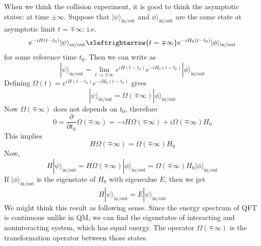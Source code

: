 When we think the collision experiment, it is good to think the asymptotic states: at time $\pm \infty$. Suppose that $|\psi\rangle_{\mathrm{in/out}}$ and $\phi\rangle_{\mathrm{in/out}}$ are the same state at asymptotic limit $t=\mp\infty$: i.e.
\begin{equation}
e^{-iH(t-t_0)}|\psi\rangle_{\mathrm{in/out}}\xleftrightarrow{t=\mp \infty} e^{-iH_0(t-t_0)}|\phi\rangle_{\mathrm{in/out}}
\end{equation}
for some reference time $t_0$. Then we can write as
\begin{equation}
|\psi\rangle_{\mathrm{in/out}}=\lim_{t\rightarrow \mp\infty}e^{iH(t-t_0)}e^{-iH_0 (t-t_0)}|\phi\rangle_{\mathrm{in/out}}
\end{equation}
Defining $\Omega(t)=e^{iH(t-t_0)}e^{-iH_0 (t-t_0)}$ gives
\begin{equation}
|\psi\rangle_{\mathrm{in/out}}=\Omega(\mp\infty)|\phi\rangle_{\mathrm{in/out}}
\end{equation}
Now $\Omega(\mp \infty)$ does not depends on $t_0$, therefore
\begin{equation}
0=\frac{\partial}{\partial t_0}\Omega(\mp \infty)=-iH\Omega(\mp \infty)+i\Omega(\mp \infty)H_0
\end{equation}
This implies
\begin{equation}
H\Omega(\mp\infty)=\Omega(\mp \infty)H_0
\end{equation}
Now,
\begin{equation}
H|\psi\rangle_{\mathrm{in/out}}=H\Omega(\mp\infty)|\phi\rangle_{\mathrm{in/out}}=\Omega(\mp\infty)H_0|\phi\rangle_{\mathrm{in/out}}
\end{equation}
If $|\phi\rangle_{\mathrm{in/out}}$ is the eigenstate of $H_0$ with eigenvalue $E$, then we get
\begin{equation}
H|\psi\rangle_{\mathrm{in/out}}=E|\psi\rangle_{\mathrm{in/out}}
\end{equation}
We might think this result as following sense. Since the energy spectrum of QFT is continuous unlike in QM, we can find the eigenstates of interacting and noninteracting system, which has equal energy. The operator $\Omega(\mp\infty)$ is the transformation operator between those states.


